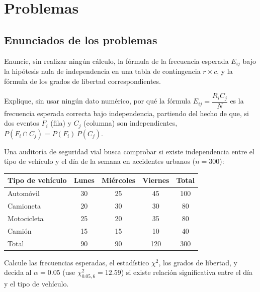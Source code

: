\section*{Problemas}

\subsection*{Enunciados de los problemas}

\begin{problema}
	\label{prob:d20c80f}
	Enuncie, sin realizar ningún cálculo, la fórmula de la frecuencia esperada $E_{ij}$ bajo la hipótesis nula de independencia en una tabla de contingencia $r\times c$, y la fórmula de los grados de libertad correspondientes.
\end{problema}

\begin{problema}
	\label{prob:b002759}
	Explique, sin usar ningún dato numérico, por qué la fórmula $E_{ij}=\dfrac{R_i C_j}{N}$ es la frecuencia esperada correcta bajo independencia, partiendo del hecho de que, si dos eventos $F_i$ (fila) y $C_j$ (columna) son independientes, $P(F_i\cap C_j)=P(F_i)\,P(C_j)$.
\end{problema}

\begin{problema}
	\label{prob:147e151}
	Una auditoría de seguridad vial busca comprobar si existe independencia entre el tipo de vehículo y el día de la semana en accidentes urbanos ($n=300$):
	\begin{center}
		\begin{tabular}{|l|c|c|c|c|}\hline
			Tipo de vehículo & Lunes & Miércoles & Viernes & Total \\\hline
			Automóvil & 30 & 25 & 45 & 100 \\\hline
			Camioneta & 20 & 30 & 30 & 80 \\\hline
			Motocicleta & 25 & 20 & 35 & 80 \\\hline
			Camión & 15 & 15 & 10 & 40 \\\hline
			Total & 90 & 90 & 120 & 300 \\\hline
		\end{tabular}
	\end{center}
	Calcule las frecuencias esperadas, el estadístico $\chi^2$, los grados de libertad, y decida al $\alpha=0.05$ (use $\chi^2_{0.05,6}=12.59$) si existe relación significativa entre el día y el tipo de vehículo.
\end{problema}

